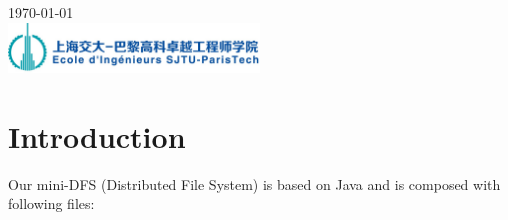 \documentclass[10pt]{article}
\begin{document}
\begin{titlepage}


{\large \today}\\[2cm] %


\includegraphics[width=0.5\textwidth]{logo_SPEIT.jpg}\\[1cm] %


\vfill %

\end{titlepage}
\indent

\section{Introduction}

Our mini-DFS (Distributed File System) is based on Java and is composed with following files:
\end{document}
